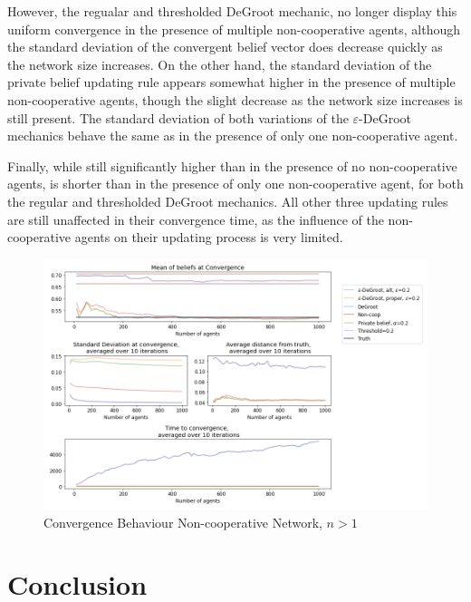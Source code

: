 \documentclass{article}
\begin{document}
\noindent However, the regualar and thresholded DeGroot mechanic, no longer display this uniform convergence in the presence of multiple non-cooperative agents, although the standard deviation of the convergent belief vector does decrease quickly as the network size increases. On the other hand, the standard deviation of the private belief updating rule appears somewhat higher in the presence of multiple non-cooperative agents, though the slight decrease as the network size increases is still present. The standard deviation of both variations of the $\varepsilon$-DeGroot mechanics behave the same as in the presence of only one non-cooperative agent.

\noindent Finally, while still significantly higher than in the presence of no non-cooperative agents, is shorter than in the presence of only one non-cooperative agent, for both the regular and thresholded DeGroot mechanics. All other three updating rules are still unaffected in their convergence time, as the influence of the non-cooperative agents on their updating process is very limited.

\begin{center}
    \begin{figure}[!htbp]
        \centering
        \includegraphics[width=1.2\textwidth]{ThesisKI/Images/WisdomCompare2.png}
        \caption{Convergence Behaviour Non-cooperative Network, $n>1$}
        \label{noncoop+:compare}
    \end{figure}
\end{center}

\newpage

\section{Conclusion}
\end{document}

